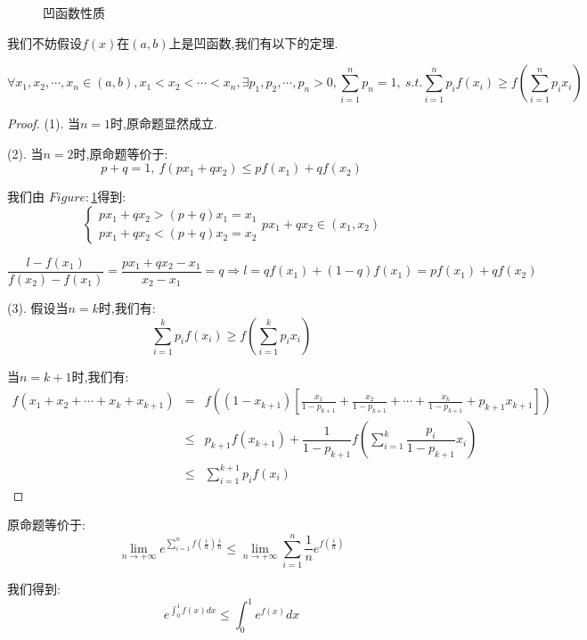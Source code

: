 \begin{figure}[ht]
	\centering
	\caption{凹函数性质}
	\label{Figure: 凹函数性质}
\end{figure}
\begin{solution}
	\begin{anymark}[凹函数性质]
		我们不妨假设$f(x)$在$(a,b)$上是凹函数,我们有以下的定理.
		
		$$\forall x_{1},x_{2},\cdots,x_{n}\in(a,b), x_{1}<x_{2}<\cdots<x_{n}, \exists p_{1},p_{2},\cdots,p_{n}>0,\sum\limits_{i=1}^{n}p_{n}=1,\ s.t. \sum\limits_{i=1}^{n}p_{i}f(x_{i})\geq f(\sum\limits_{i=1}^{n}p_{i}x_{i})$$
		\begin{proof}
			
			(1). 当$n=1$时,原命题显然成立.
			
			(2). 当$n=2$时,原命题等价于: 
			$$p+q=1,\ f(px_{1}+qx_{2})\leq pf(x_{1})+qf(x_{2})$$
			
			我们由 $Figure: $\ref{Figure: 凹函数性质}得到: 
			$$\left\lbrace
			\begin{array}{l}
				px_{1}+qx_{2}>(p+q)x_{1}=x_{1}\\
				px_{1}+qx_{2}<(p+q)x_{2}=x_{2}
			\end{array}
			\right. px_{1}+qx_{2}\in(x_{1},x_{2})$$
			
			$$\dfrac{l-f(x_{1})}{f(x_{2})-f(x_{1})}=\dfrac{px_{1}+qx_{2}-x_{1}}{x_{2}-x_{1}}=q\Rightarrow l=qf(x_{1})+(1-q)f(x_{1})=pf(x_{1})+qf(x_{2})$$
			
			(3). 假设当$n=k$时,我们有: $$\sum\limits_{i=1}^{k}p_{i}f(x_{i})\geq f(\sum\limits_{i=1}^{k}p_{i}x_{i})$$
			
			当$n=k+1$时,我们有: 
			\begin{eqnarray*}
				f(x_{1}+x_{2}+\cdots+x_{k}+x_{k+1})&=&f((1-x_{k+1})[\frac{x_{1}}{1-p_{k+1}}+\frac{x_{2}}{1-p_{k+1}}+\cdots+\frac{x_{k}}{1-p_{k+1}}+p_{k+1}x_{k+1}])\\
				&\leq& p_{k+1}f(x_{k+1})+\dfrac{1}{1-p_{k+1}}f(\sum\limits_{i=1}^{k}\dfrac{p_{i}}{1-p_{k+1}}x_{i})\\
				&\leq & \sum\limits_{i=1}^{k+1}p_{i}f(x_{i})
			\end{eqnarray*}
		\end{proof}
	\end{anymark}
	原命题等价于: 
	$$\lim\limits_{n\rightarrow+\infty}e^{\sum\limits_{i=1}^{n}f(\frac{i}{n})\frac{i}{n}}\leq \lim\limits_{n\rightarrow+\infty}\sum\limits_{i=1}^{n}\frac{1}{n}e^{f(\frac{i}{n})}$$
	
	我们得到: 
	$$e^{\int_{0}^{1}f(x)dx}\leq \int_{0}^{1}e^{f(x)}dx$$
\end{solution}
